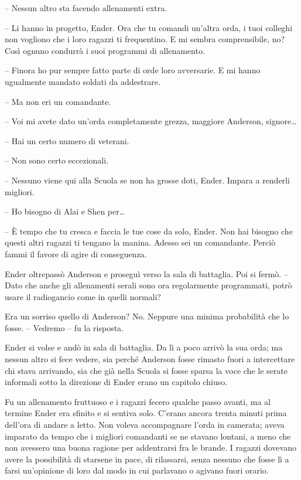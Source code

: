 {-- Nessun altro sta facendo allenamenti extra.}

{-- Li hanno in progetto, Ender. Ora che tu comandi un'altra orda, i
	tuoi colleghi non vogliono che i loro ragazzi ti frequentino. E mi
	sembra comprensibile, no? Così ognuno condurrà i suoi programmi di
	allenamento.}

{-- Finora ho pur sempre fatto parte di orde loro avversarie. E mi hanno
	ugualmente mandato soldati da addestrare.}

{-- Ma non eri un comandante.}

{-- Voi mi avete dato un'orda completamente grezza, maggiore Anderson,
	signore\ldots{}}

{-- Hai un certo numero di veterani.}

{-- Non sono certo eccezionali.}

{-- Nessuno viene qui alla Scuola se non ha grosse doti, Ender. Impara a
	renderli migliori.}

{-- Ho bisogno di Alai e Shen per\ldots{}}

{-- È tempo che tu cresca e faccia le tue cose da solo, Ender. Non hai
	bisogno che questi altri ragazzi ti tengano la manina. Adesso sei un
	comandante. Perciò fammi il favore di agire di conseguenza.}

{Ender oltrepassò Anderson e proseguì verso la sala di battaglia. Poi si
	fermò. -- Dato che anche gli allenamenti serali sono ora regolarmente
	programmati, potrò usare il radiogancio come in quelli normali?}

{Era un sorriso quello di Anderson? No. Neppure una minima probabilità
	che lo fosse. -- Vedremo -- fu la risposta.}

{Ender si volse e andò in sala di battaglia. Da lì a poco arrivò la sua
	orda; ma nessun altro si fece vedere, sia perché Anderson fosse rimasto
	fuori a intercettare chi stava arrivando, sia che già nella Scuola si
	fosse sparsa la voce che le serate informali sotto la direzione di Ender
	erano un capitolo chiuso.}

{Fu un allenamento fruttuoso e i ragazzi fecero qualche passo avanti, ma
	al termine Ender era sfinito e si sentiva solo. C'erano ancora trenta
	minuti prima dell'ora di andare a letto. Non voleva accompagnare l'orda
	in camerata; aveva imparato da tempo che i migliori comandanti se ne
	stavano lontani, a meno che non avessero una buona ragione per
	addentrarsi fra le brande. I ragazzi dovevano avere la possibilità di
	starsene in pace, di rilassarsi, senza nessuno che fosse lì a farsi
	un'opinione di loro dal modo in cui parlavano o agivano fuori orario.}

